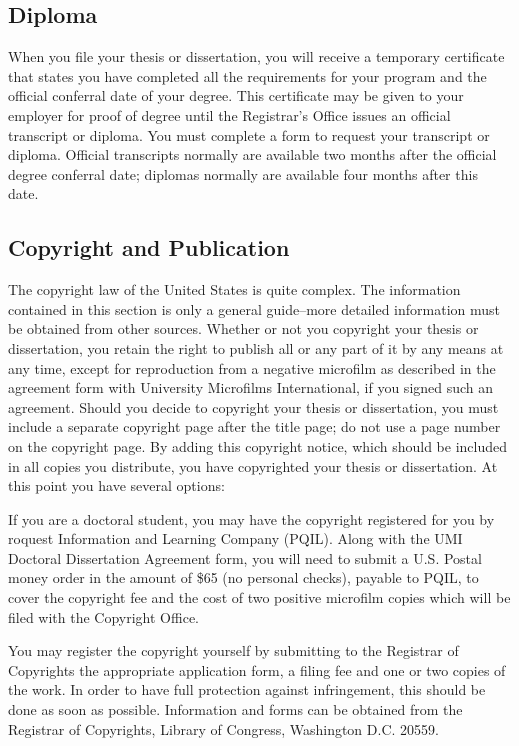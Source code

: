 \subsection{Diploma}
%
When you file your thesis or dissertation, you will receive a temporary certificate that states you have completed all the requirements for your program and the official conferral date of your degree. This certificate may be given to your employer for proof of degree until the Registrar's Office issues an official transcript or diploma. You must complete a form to request your transcript or diploma. Official transcripts normally are available two months after the official degree conferral date; diplomas normally are available four months after this date.

\subsection{Copyright and Publication}
%
The copyright law of the United States is quite complex. The information contained in this section is only a general guide--more detailed information must be obtained from other sources. Whether or not you copyright your thesis or dissertation, you retain the right to publish all or any part of it by any means at any time, except for reproduction from a negative microfilm as described in the agreement form with University Microfilms International, if you signed such an agreement. Should you decide to copyright your thesis or dissertation, you must include a separate copyright page after the title page; do not use a page number on the copyright page. By adding this copyright notice, which should be included in all copies you distribute, you have copyrighted your thesis or dissertation. At this point you have several options:

If you are a doctoral student, you may have the copyright registered for you by roquest Information and Learning Company (PQIL). Along with the UMI Doctoral Dissertation Agreement form, you will need to submit a U.S. Postal money order in the amount of \$65 (no personal checks), payable to PQIL, to cover the copyright fee and the cost of two positive microfilm copies which will be filed with the Copyright Office.

You may register the copyright yourself by submitting to the Registrar of Copyrights the appropriate application form, a filing fee and one or two copies of the work. In order to have full protection against infringement, this should be done as soon as possible. Information and forms can be obtained from the Registrar of Copyrights, Library of Congress, Washington D.C. 20559.

